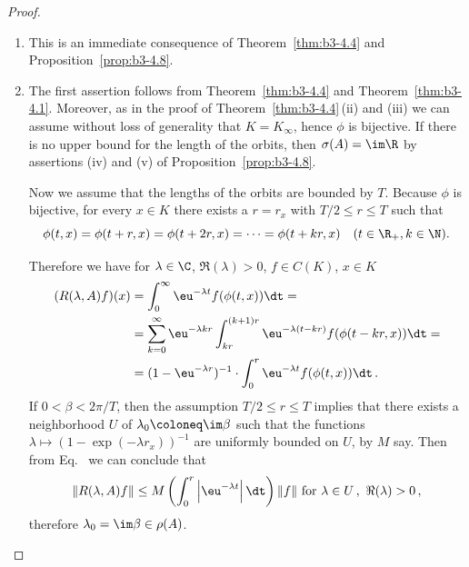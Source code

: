 \begin{proof}
\begin{enumerate}[\upshape (i), wide, labelindent=.25em]%
\item 
	This is an immediate consequence of Theorem~\ref{thm:b3-4.4} and Proposition~\ref{prop:b3-4.8}.
	
\item 
	The first assertion follows from Theorem~\ref{thm:b3-4.4} and Theorem~\ref{thm:b3-4.1}.
	Moreover, as in the proof of Theorem~\ref{thm:b3-4.4}\,(ii) and (iii) we can assume without loss of generality that $K = K_{\infty}$, hence $\phi$ is bijective.
	If there is no upper bound for the length of the orbits, then $\sigma(A) = \im\R$ by assertions (iv) and (v) of Proposition~\ref{prop:b3-4.8}.
	
	Now we assume that the lengths of the orbits are bounded by $T$.
	Because $\phi$ is bijective, for every $x \in K$ there exists a $r = r_{x}$ with $T/2 \leq r \leq T$ such that 
	\[
	\phi(t,x) = \phi(t+r,x) = \phi(t+2r,x) = \cdots = \phi(t+kr,x) \quad (t \in \R_{+}, k \in \N).
	\]
	
	Therefore we have for $\lambda \in \C$, $\Re(\lambda) > 0$, $f \in C(K)$, $x \in K$
	\begin{equation}\label{eq:b3-4.15}
		\begin{split}
			(R(\lambda,A)f)(x) &= \int_{0}^{\infty} \eu^{-\lambda t}f(\phi(t,x)) \dt = \\
			&= \sum_{k=0}^{\infty} \eu^{-\lambda kr}\int_{kr}^{(k+1)r} \eu^{-\lambda(t-kr)} f(\phi(t-kr,x)) \dt =  \\
			&= (1 - \eu^{-\lambda r})^{-1}\cdot\int_{0}^{r} \eu^{-\lambda t} f(\phi(t,x)) \dt\,.
		\end{split}
	\end{equation}
	If\/ $0 < \beta < 2\pi/T$, then the assumption $T/2 \leq r \leq T$ implies that there exists a neighborhood $U$ of\/ $\lambda_{0} \coloneq \im\beta$ such that the functions $\lambda \mapsto (1 - \exp(-\lambda r_{x}))^{-1}$ are uniformly bounded on $U$, by $M$ say.
    Then from Eq.~ we can conclude that 
    \[
    \|R(\lambda,A)f\| \leq M\left(\int_{0}^{r} \left|\eu^{-\lambda t}\right|\dt\right)\|f\| \text{ for } \lambda \in U\,,\ \Re(\lambda) > 0\,,
    \]
    therefore $\lambda_{0} = \im\beta \in \rho(A)$.\qedhere
\end{enumerate}
\end{proof}
